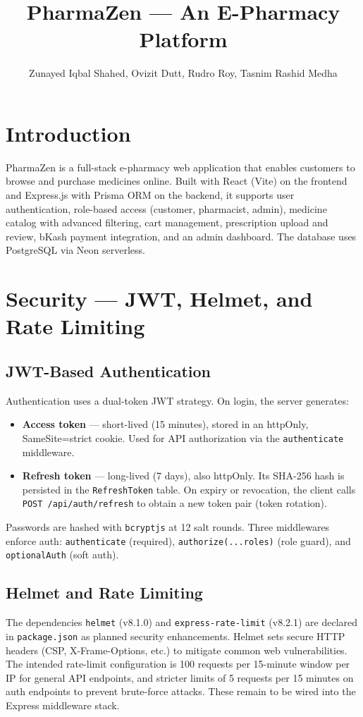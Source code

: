 \documentclass[12pt,a4paper]{article}
\title{PharmaZen --- An E-Pharmacy Platform}
\author{Zunayed Iqbal Shahed, Ovizit Dutt, Rudro Roy, Tasnim Rashid Medha}
\date{}
\begin{document}
\maketitle
\thispagestyle{empty}
\newpage

\section{Introduction}
PharmaZen is a full-stack e-pharmacy web application that enables customers to browse and purchase medicines online. Built with React (Vite) on the frontend and Express.js with Prisma ORM on the backend, it supports user authentication, role-based access (customer, pharmacist, admin), medicine catalog with advanced filtering, cart management, prescription upload and review, bKash payment integration, and an admin dashboard. The database uses PostgreSQL via Neon serverless.

\section{Security --- JWT, Helmet, and Rate Limiting}

\subsection{JWT-Based Authentication}
Authentication uses a dual-token JWT strategy. On login, the server generates:
\begin{itemize}
    \item \textbf{Access token} --- short-lived (15 minutes), stored in an httpOnly, SameSite=strict cookie. Used for API authorization via the \texttt{authenticate} middleware.
    \item \textbf{Refresh token} --- long-lived (7 days), also httpOnly. Its SHA-256 hash is persisted in the \texttt{RefreshToken} table. On expiry or revocation, the client calls \texttt{POST /api/auth/refresh} to obtain a new token pair (token rotation).
\end{itemize}
Passwords are hashed with \texttt{bcryptjs} at 12 salt rounds. Three middlewares enforce auth: \texttt{authenticate} (required), \texttt{authorize(...roles)} (role guard), and \texttt{optionalAuth} (soft auth).

\subsection{Helmet and Rate Limiting}
The dependencies \texttt{helmet} (v8.1.0) and \texttt{express-rate-limit} (v8.2.1) are declared in \texttt{package.json} as planned security enhancements. Helmet sets secure HTTP headers (CSP, X-Frame-Options, etc.) to mitigate common web vulnerabilities. The intended rate-limit configuration is 100 requests per 15-minute window per IP for general API endpoints, and stricter limits of 5 requests per 15 minutes on auth endpoints to prevent brute-force attacks. These remain to be wired into the Express middleware stack.
\end{document}
